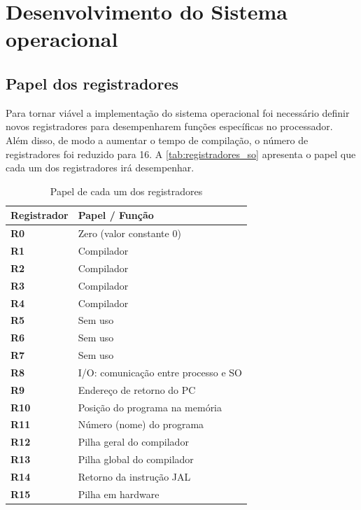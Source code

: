 \documentclass[
	12pt,				%
	oneside,
	a4paper,			%
	english,			%
	french,				%
	spanish,			%
	brazil,				%
	]{abntex2}
\begin{document}
\chapter{Desenvolvimento do Sistema operacional}

\section{Papel dos registradores}

Para tornar viável a implementação do sistema operacional foi necessário definir novos registradores para desempenharem funções específicas no processador. Além disso, de modo a aumentar o tempo de compilação, o número de registradores foi reduzido para 16. A \autoref{tab:registradores_so} apresenta o papel que cada um dos registradores irá desempenhar.

\begin{table}[h!]
\centering
\caption{Papel de cada um dos registradores}
\label{tab:registradores_so}
\renewcommand{\arraystretch}{1.3}
\begin{tabular}{l l}
\toprule
\textbf{Registrador} & \textbf{Papel / Função} \\
\midrule
\textbf{R0}  & Zero (valor constante 0) \\
\textbf{R1}  & Compilador \\
\textbf{R2}  & Compilador \\
\textbf{R3}  & Compilador \\
\textbf{R4}  & Compilador \\
\textbf{R5}  & Sem uso \\
\textbf{R6}  & Sem uso \\
\textbf{R7}  & Sem uso \\
\textbf{R8}  & I/O: comunicação entre processo e SO \\
\textbf{R9}  & Endereço de retorno do PC \\
\textbf{R10} & Posição do programa na memória \\
\textbf{R11} & Número (nome) do programa \\
\textbf{R12} & Pilha geral do compilador \\
\textbf{R13} & Pilha global do compilador \\
\textbf{R14} & Retorno da instrução JAL \\
\textbf{R15} & Pilha em hardware \\
\bottomrule
\end{tabular}
\end{table}
\end{document}
